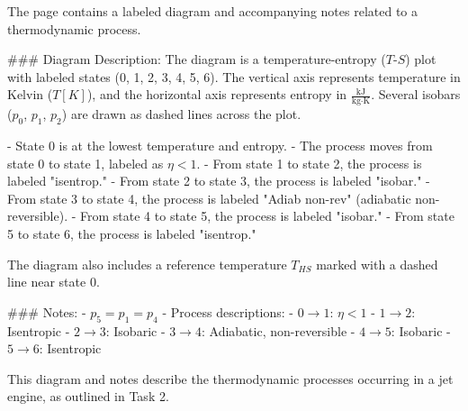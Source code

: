 The page contains a labeled diagram and accompanying notes related to a thermodynamic process.  

### Diagram Description:  
The diagram is a temperature-entropy (\( T \)-\( S \)) plot with labeled states (0, 1, 2, 3, 4, 5, 6). The vertical axis represents temperature in Kelvin (\( T [K] \)), and the horizontal axis represents entropy in \( \frac{\text{kJ}}{\text{kg·K}} \). Several isobars (\( p_0 \), \( p_1 \), \( p_2 \)) are drawn as dashed lines across the plot.  

- State 0 is at the lowest temperature and entropy.  
- The process moves from state 0 to state 1, labeled as \( \eta < 1 \).  
- From state 1 to state 2, the process is labeled "isentrop."  
- From state 2 to state 3, the process is labeled "isobar."  
- From state 3 to state 4, the process is labeled "Adiab non-rev" (adiabatic non-reversible).  
- From state 4 to state 5, the process is labeled "isobar."  
- From state 5 to state 6, the process is labeled "isentrop."  

The diagram also includes a reference temperature \( T_{HS} \) marked with a dashed line near state 0.  

### Notes:  
- \( p_5 = p_1 = p_4 \)  
- Process descriptions:  
  - \( 0 \to 1 \): \( \eta < 1 \)  
  - \( 1 \to 2 \): Isentropic  
  - \( 2 \to 3 \): Isobaric  
  - \( 3 \to 4 \): Adiabatic, non-reversible  
  - \( 4 \to 5 \): Isobaric  
  - \( 5 \to 6 \): Isentropic  

This diagram and notes describe the thermodynamic processes occurring in a jet engine, as outlined in Task 2.